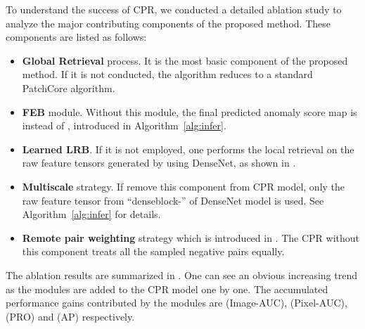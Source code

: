 \documentclass[lettersize,journal]{IEEEtran}
\begin{document}
To understand the success of CPR, we conducted a detailed ablation study to analyze the
major contributing components of the proposed method. These components are listed as
follows:
\begin{itemize}
  \item
        \textbf{Global Retrieval} process. It is the most basic component of the proposed method.
        If it is not conducted, the algorithm reduces to a standard PatchCore
        \cite{roth2022towards} algorithm.
  \item
        \textbf{FEB} module. Without this module, the final predicted anomaly score map is
         instead of , introduced in
        Algorithm~\ref{alg:infer}.
  \item
        \textbf{Learned LRB}. If it is not employed, one performs the local retrieval on the
        raw feature tensors generated by using DenseNet, as shown in .
  \item
        \textbf{Multiscale} strategy. If remove this component from CPR model, only the raw
        feature tensor from ``denseblock-'' of DenseNet model is used. See
        Algorithm~\ref{alg:infer} for details.
  \item
        \textbf{Remote pair weighting} strategy which is introduced in
        . The CPR without this component treats all the sampled
        negative pairs equally.
\end{itemize}
The ablation results are summarized in . One can see an obvious
increasing trend as the modules are added to the CPR model one by one. The accumulated
performance gains contributed by the modules are  (Image-AUC),  (Pixel-AUC),
 (PRO) and  (AP) respectively.
\end{document}
